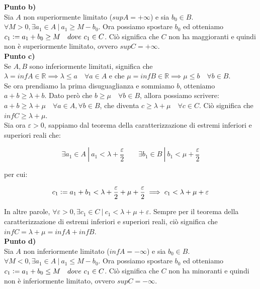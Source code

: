 \documentclass{article}
\begin{document}
\noindent \textbf{Punto b)}\\

\noindent Sia $A$ non superiormente limitato ($supA = + \infty$) e sia $b_0 \in B$. $\forall M > 0, \exists a_1 \in A \ | \ a_1 \geq M - b_0$. Ora possiamo spostare $b_0$ ed otteniamo $c_1 \vcentcolon = a_1 + b_0 \geq M \quad dove \ c_1 \in C$. Ciò significa che $C$ non ha maggioranti e quindi non è superiormente limitato, ovvero $supC = + \infty$.\\

\noindent \textbf{Punto c)}\\

\noindent Se $A, B$ sono inferiormente limitati, significa che $\lambda = infA \in \mathbb{R} \implies \lambda \leq a \quad \forall a \in A$ e che $\mu = infB \in \mathbb{R} \implies \mu \leq b \quad \forall b \in B$. \\
Se ora prendiamo la prima disuguaglianza e sommiamo $b$, otteniamo $a + b \geq \lambda + b$. Dato però che $b \geq \mu \quad \forall b \in B$, allora possiamo scrivere: $a + b \geq \lambda + \mu \quad \forall a \in A, \forall b \in B$, che diventa $c \geq \lambda + \mu \quad \forall c \in C$. Ciò significa che $infC \geq \lambda + \mu$. \\
Sia ora $\varepsilon > 0$, sappiamo dal teorema della caratterizzazione di estremi inferiori e superiori reali che:

\begin{equation*}
    \exists a_1 \in A \ | \ a_1 < \lambda + \frac{\varepsilon}{2} \qquad \exists b_1 \in B \ | \ b_1 < \mu + \frac{\varepsilon}{2}
\end{equation*}

\noindent per cui:

\begin{equation*}
    c_1 \vcentcolon = a_1 + b_1 < \lambda + \frac{\varepsilon}{2} + \mu + \frac{\varepsilon}{2} \implies c_1 < \lambda + \mu + \varepsilon
\end{equation*}

\noindent In altre parole, $\forall \varepsilon > 0, \exists c_1 \in C \ | \ c_1 < \lambda + \mu + \varepsilon$. Sempre per il teorema della caratterizzazione di estremi inferiori e superiori reali, ciò significa che $infC = \lambda + \mu = infA + infB$. \\

\noindent \textbf{Punto d)}\\

\noindent Sia $A$ non inferiormente limitato ($infA = - \infty$) e sia $b_0 \in B$. $\forall M < 0, \exists a_1 \in A \ | \ a_1 \leq M - b_0$. Ora possiamo spostare $b_0$ ed otteniamo $c_1 \vcentcolon = a_1 + b_0 \leq M \quad dove \ c_1 \in C$. Ciò significa che $C$ non ha minoranti e quindi non è inferiormente limitato, ovvero $supC = - \infty$.\\
\end{document}

